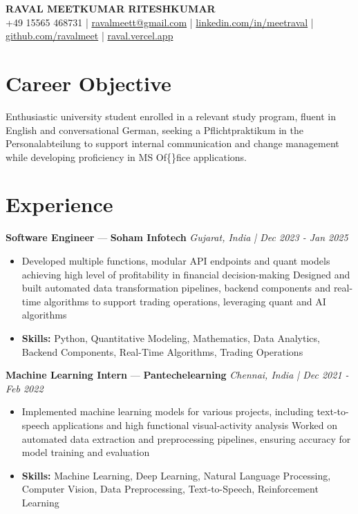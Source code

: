 \documentclass[a4paper,10pt]{article}
\begin{document}
\begin{center}
  {\Large\bfseries RAVAL MEETKUMAR RITESHKUMAR}\\[2pt]
  {\small +49 15565 468731 \;|\; \href{mailto:ravalmeett@gmail.com}{ravalmeett@gmail.com} \;|\; \href{https://www.linkedin.com/in/meetraval/}{linkedin.com/in/meetraval} \;|\; \href{https://github.com/ravalmeet}{github.com/ravalmeet} \;|\; \href{https://raval.vercel.app/}{raval.vercel.app}}
\end{center}
\vspace{-3pt}

\section*{Career Objective}
Enthusiastic university student enrolled in a relevant study program, fluent in English and conversational German, seeking a Pflichtpraktikum in the Personalabteilung to support internal communication and change management while developing proficiency in MS Of\{\}fice applications.\par

\section*{Experience}
\textbf{Software Engineer} — \textbf{Soham Infotech} \hfill \textit{Gujarat, India \;|\; Dec 2023 - Jan 2025}\par
\vspace{1pt}
\begin{itemize}
  \item Developed multiple functions, modular API endpoints and quant models achieving high level of profitability in financial decision-making Designed and built automated data transformation pipelines, backend components and real-time algorithms to support trading operations, leveraging quant and AI algorithms
  \item \textbf{Skills:} Python, Quantitative Modeling, Mathematics, Data Analytics, Backend Components, Real-Time Algorithms, Trading Operations
\end{itemize}
\vspace{3pt}
\textbf{Machine Learning Intern} — \textbf{Pantechelearning} \hfill \textit{Chennai, India \;|\; Dec 2021 - Feb 2022}\par
\vspace{1pt}
\begin{itemize}
  \item Implemented machine learning models for various projects, including text-to-speech applications and high functional visual-activity analysis Worked on automated data extraction and preprocessing pipelines, ensuring accuracy for model training and evaluation
  \item \textbf{Skills:} Machine Learning, Deep Learning, Natural Language Processing, Computer Vision, Data Preprocessing, Text-to-Speech, Reinforcement Learning
\end{itemize}
\end{document}
